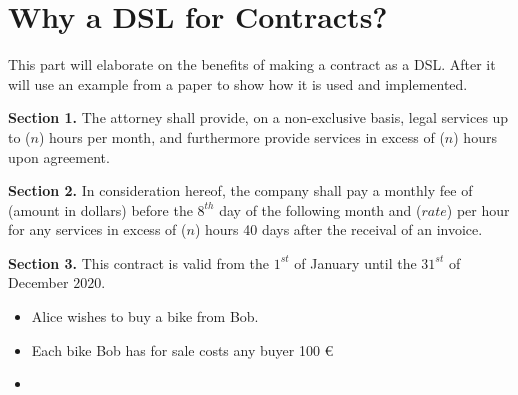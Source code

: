 \documentclass{ituthesis}
\begin{document}
\section{Why a DSL for Contracts?}

This part will elaborate on the benefits of making a contract as a DSL. After it will use an example from a paper to show how it is used and implemented.



\begin{tcolorbox}
\textbf{Section 1.} The attorney shall provide, on a non-exclusive basis, legal services up to ($n$) hours per month, and furthermore provide services in excess of ($n$) hours upon agreement.\par
\textbf{Section 2.} In consideration hereof, the company shall pay a monthly fee of (amount in dollars) before the $8^{th}$ day of the following month and ($rate$) per hour for any services in excess of ($n$) hours 40 days after the receival of an invoice.\par
\textbf{Section 3.} This contract is valid from the $1^{st}$ of January until the $31^{st}$ of December $2020$.
\end{tcolorbox}


\begin{tcolorbox}
\begin{itemize}
    \item Alice wishes to buy a bike from Bob.
    \item Each bike Bob has for sale costs any buyer 100 €
    \item 
\end{itemize}
\end{tcolorbox}

\end{document}
